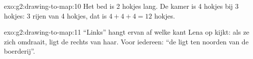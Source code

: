 \begin{solution}{exo:g2:drawing-to-map:10}
Het bed is 2 hokjes lang. De kamer is 4 hokjes bij 3 hokjes: 3 rijen van
4 hokjes, dat is $4 + 4 + 4 = 12$ hokjes.
\end{solution}

\begin{solution}{exo:g2:drawing-to-map:11}
``Links'' hangt ervan af welke kant Lena op kijkt: als ze zich omdraait,
ligt de  rechts van haar. Voor iedereen: ``de  ligt ten noorden
van de boerderij''.
\end{solution}
